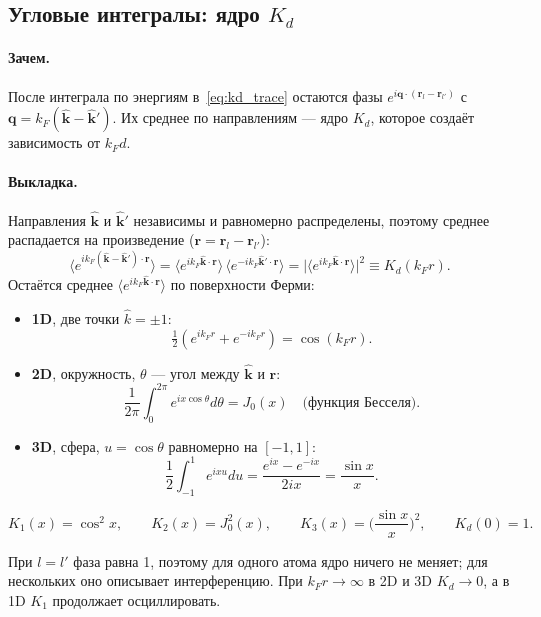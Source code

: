 \subsection{Угловые интегралы: ядро $K_d$}
\label{sec:kd_angles}

\paragraph{Зачем.} После интеграла по энергиям в~\eqref{eq:kd_trace} остаются
фазы $e^{i\mathbf q\cdot(\mathbf r_l-\mathbf r_{l'})}$ с $\mathbf q=k_F(\hat{\mathbf k}-\hat{\mathbf k}')$. Их среднее
по направлениям --- ядро $K_d$, которое создаёт зависимость от $k_Fd$.

\paragraph{Выкладка.} Направления $\hat{\mathbf k}$ и $\hat{\mathbf k}'$ независимы и равномерно
распределены, поэтому среднее распадается на произведение ($\mathbf r=\mathbf r_l-\mathbf r_{l'}$):
\[
\big\langle e^{ik_F(\hat{\mathbf k}-\hat{\mathbf k}')\cdot\mathbf r}\big\rangle
=\langle e^{ik_F\hat{\mathbf k}\cdot\mathbf r}\rangle\,\langle e^{-ik_F\hat{\mathbf k}'\cdot\mathbf r}\rangle
=\big|\langle e^{ik_F\hat{\mathbf k}\cdot\mathbf r}\rangle\big|^2\equiv K_d(k_Fr).
\]
Остаётся среднее $\langle e^{ik_F\hat{\mathbf k}\cdot\mathbf r}\rangle$ по поверхности Ферми:
\begin{itemize}
\item \textbf{1D}, две точки $\hat k=\pm1$:
  \[
  \tfrac12(e^{ik_Fr}+e^{-ik_Fr})=\cos(k_Fr).
  \]
\item \textbf{2D}, окружность, $\theta$ --- угол между $\hat{\mathbf k}$ и $\mathbf r$:
  \[
  \frac{1}{2\pi}\int_0^{2\pi}e^{ix\cos\theta}d\theta=J_0(x)\quad\text{(функция Бесселя)}.
  \]
\item \textbf{3D}, сфера, $u=\cos\theta$ равномерно на $[-1,1]$:
  \[
  \frac12\int_{-1}^{1}e^{ixu}du=\frac{e^{ix}-e^{-ix}}{2ix}=\frac{\sin x}{x}.
  \]
\end{itemize}
\begin{resbox}
\[
K_1(x)=\cos^2x,\qquad K_2(x)=J_0^2(x),\qquad K_3(x)=\Big(\frac{\sin x}{x}\Big)^2,
\qquad K_d(0)=1 .
\]
\end{resbox}
При $l=l'$ фаза равна 1, поэтому для одного атома ядро ничего не меняет; для
нескольких оно описывает интерференцию. При $k_Fr\to\infty$ в 2D и 3D $K_d\to0$, а
в 1D $K_1$ продолжает осциллировать.

